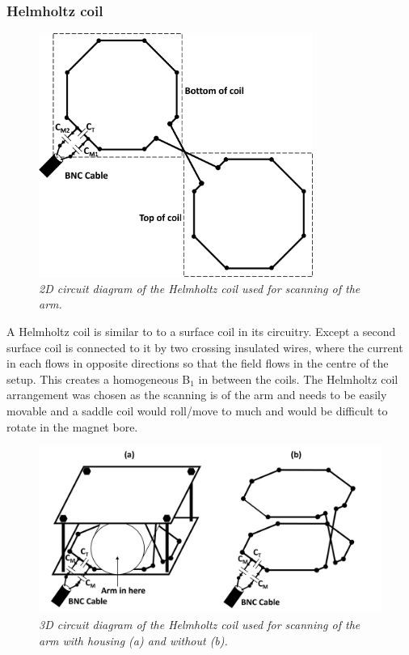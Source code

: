\documentclass[class=article, crop=false]{standalone}
\begin{document}
\subsubsection{Helmholtz coil}

\begin{figure}
    \centering
    \includegraphics[width=0.8\textwidth]{Figures/Theory/Planar_Helmholtz.png}
    \caption{\textit{2D circuit diagram of the Helmholtz coil used for scanning of the arm.}}
    \label{fig:theory:2D_Helmholtz}
\end{figure}

A Helmholtz coil is similar to to a surface coil in its circuitry. Except a second surface coil is connected to it by two crossing insulated wires, where the current in each flows in opposite directions so that the field flows in the centre of the setup. This creates a homogeneous B$_1$ in between the coils. The Helmholtz coil arrangement was chosen as the scanning is of the arm and needs to be easily movable and a saddle coil would roll/move to much and would be difficult to rotate in the magnet bore.

\begin{figure}
    \centering
    \includegraphics[width=1\textwidth]{Figures/Theory/3D_Helmholtz.png}
    \caption{\textit{3D circuit diagram of the Helmholtz coil used for scanning of the arm with housing (a) and without (b).}}
    \label{fig:theory:3D_Helmholtz}
\end{figure}
\end{document}
